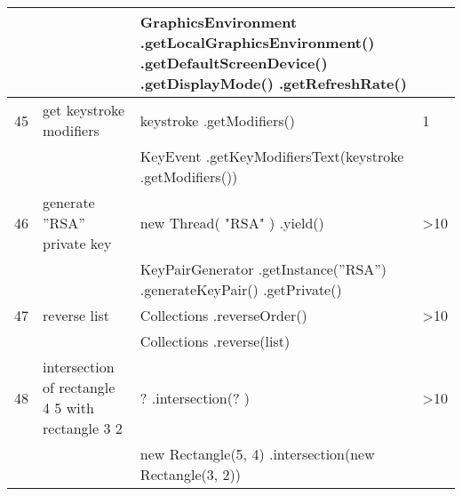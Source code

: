 \begin{longtable}{|p{}|p{}|p{}|p{}|}
		\rowcolor[HTML]{9AFF99} 
		&                                                        & GraphicsEnvironment .getLocalGraphicsEnvironment() .getDefaultScreenDevice() .getDisplayMode() .getRefreshRate() &                                         \\ \hline
		\rowcolor[HTML]{FFCCC9} 
		45                                & get keystroke modifiers                                & keystroke  .getModifiers()                                                                                       & 1                                       \\ \hline
		\rowcolor[HTML]{9AFF99} 
		&                                                        & KeyEvent .getKeyModifiersText(keystroke .getModifiers())                                                         &                                         \\ \hline
		\rowcolor[HTML]{FFCCC9} 
		46                                & generate ”RSA” private key                             & new Thread( "RSA" ) .yield()                                                                                     & \textgreater{}10                        \\ \hline
		\rowcolor[HTML]{9AFF99} 
		&                                                        & KeyPairGenerator .getInstance(”RSA”) .generateKeyPair() .getPrivate()                                            &                                         \\ \hline
		\rowcolor[HTML]{FFCCC9} 
		47                                & reverse list                                           & Collections .reverseOrder()                                                                                      & \textgreater{}10                        \\ \hline
		\rowcolor[HTML]{9AFF99} 
		&                                                        & Collections .reverse(list)                                                                                       &                                         \\ \hline
		\rowcolor[HTML]{FFCCC9} 
		48                                & intersection of rectangle 4 5 with rectangle 3 2       & ? .intersection(? )                                                                                              & \textgreater{}10                        \\ \hline
		\rowcolor[HTML]{9AFF99} 
		&                                                        & new Rectangle(5, 4) .intersection(new Rectangle(3, 2))                                                           &                                         \\ \hline

\end{longtable}
